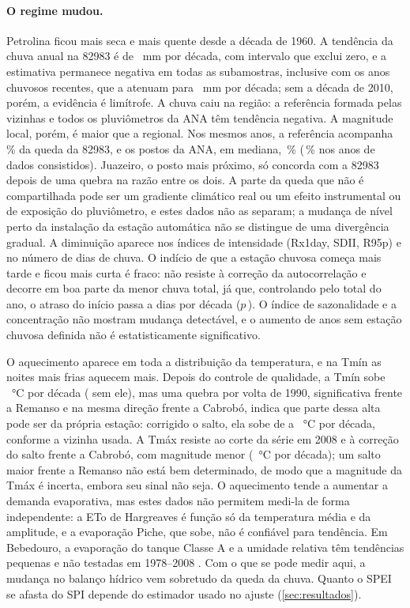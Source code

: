 \documentclass[11pt,a4paper]{article}
\newcommand{\Est}{82983}
\begin{document}
\paragraph{O regime mudou.} Petrolina ficou mais seca e mais quente desde a década de 1960. A
tendência da chuva anual na \Est{} é de \SenChuva{}~mm por década, com intervalo que exclui zero, e a
estimativa permanece negativa em todas as subamostras, inclusive com os anos chuvosos recentes, que a
atenuam para \SenChuvaRecentes{}~mm por década; sem a década de 2010, porém, a evidência é limítrofe. A
chuva caiu na região: a referência formada pelas vizinhas e todos os pluviômetros da ANA têm tendência
negativa. A magnitude local, porém, é maior que a regional. Nos mesmos anos, a referência acompanha
\PctRefEst{}\,\% da queda da \Est{}, e os postos da ANA, em mediana, \RazaoSenAnaMediana{}\,\%
(\RazaoSenAnaConsMediana{}\,\% nos anos de dados consistidos). Juazeiro, o posto mais próximo, só
concorda com a \Est{} depois de uma quebra na razão entre os dois. A parte da queda que não é
compartilhada pode ser um gradiente climático real ou um efeito instrumental ou de exposição do
pluviômetro, e estes dados não as separam; a mudança de nível perto da instalação da estação
automática não se distingue de uma divergência gradual. A diminuição aparece nos índices de
intensidade (Rx1day, SDII, R95p) e no número de dias de chuva. O indício de
que a estação chuvosa começa mais tarde e ficou mais curta é fraco: não resiste à correção da
autocorrelação e decorre em boa parte da menor chuva total, já que, controlando pelo total do ano, o
atraso do início passa a \SenInicioControleTotal{} dias por década ($p$\,\PInicioControleTotal). O índice
de sazonalidade e a concentração não mostram mudança detectável, e o aumento de anos sem estação
chuvosa definida não é estatisticamente significativo.

O aquecimento aparece em toda a distribuição da temperatura, e na Tmín as noites mais frias aquecem
mais. Depois do controle de qualidade, a Tmín sobe \SenTmin{}~°C por década (\SenTminSemQC{} sem ele),
mas uma quebra por volta de 1990, significativa frente a Remanso e na mesma direção frente a Cabrobó,
indica que parte dessa alta pode ser da própria estação: corrigido o salto, ela sobe de
\SenTminAjustada{} a \SenTminAjustadaCabrobo{}~°C por década, conforme a vizinha usada. A Tmáx resiste ao corte da série em 2008 e à
correção do salto frente a Cabrobó, com magnitude menor (\SenTmaxAjustada{}~°C por década); um salto
maior frente a Remanso não está bem determinado, de modo que a magnitude da Tmáx é incerta, embora seu
sinal não seja. O aquecimento tende a aumentar a demanda evaporativa, mas estes dados não permitem
medi-la de forma independente: a ETo de Hargreaves é função só da temperatura média e da amplitude, e
a evaporação Piche, que sobe, não é confiável para tendência. Em Bebedouro, a evaporação do tanque
Classe A e a umidade relativa têm tendências pequenas e não testadas em 1978--2008
\parencite{teixeira2011}. Com o que se pode medir aqui, a mudança no balanço hídrico vem sobretudo da
queda da chuva. Quanto o SPEI se afasta do SPI depende do estimador usado no ajuste (\cref{sec:resultados}).
\end{document}
